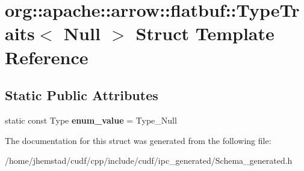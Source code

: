 \hypertarget{structorg_1_1apache_1_1arrow_1_1flatbuf_1_1TypeTraits_3_01Null_01_4}{}\section{org\+:\+:apache\+:\+:arrow\+:\+:flatbuf\+:\+:Type\+Traits$<$ Null $>$ Struct Template Reference}
\label{structorg_1_1apache_1_1arrow_1_1flatbuf_1_1TypeTraits_3_01Null_01_4}
\subsection*{Static Public Attributes}
\begin{DoxyCompactItemize}
\item 
static const Type {\bfseries enum\+\_\+value} = Type\+\_\+\+Null\hypertarget{structorg_1_1apache_1_1arrow_1_1flatbuf_1_1TypeTraits_3_01Null_01_4_adcfc2829856218fa14bb7c11ff288321}{}\label{structorg_1_1apache_1_1arrow_1_1flatbuf_1_1TypeTraits_3_01Null_01_4_adcfc2829856218fa14bb7c11ff288321}

\end{DoxyCompactItemize}


The documentation for this struct was generated from the following file\+:\begin{DoxyCompactItemize}
\item 
/home/jhemstad/cudf/cpp/include/cudf/ipc\+\_\+generated/Schema\+\_\+generated.\+h\end{DoxyCompactItemize}
